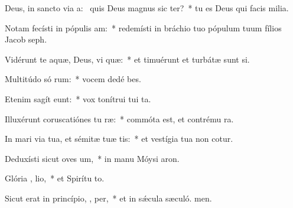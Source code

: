 \item Deus, in sancto via a:~\pscross{} quis Deus magnus sic  ter?~* tu es Deus qui facis milia.
\item Notam fecísti in pópulis  am:~* redemísti in bráchio tuo pópulum tuum fílios Jacob  seph.
\item Vidérunt te aquæ, Deus, vi  quæ:~* et timuérunt et turbátæ sunt si.
\item Multitúdo só rum:~* vocem dedé bes.
\item Etenim sagít  eunt:~* vox tonítrui tui  ta.
\item Illuxérunt coruscatiónes tu  ræ:~* commóta est, et contrému ra.
\item In mari via tua, et sémitæ tuæ   tis:~* et vestígia tua non cotur.
\item Deduxísti sicut oves  um,~* in manu Móysi  aron.
\item Glória ,  lio,~* et Spirítu to.
\item Sicut erat in princípio,  ,  per,~* et in sǽcula sæculó. men.
